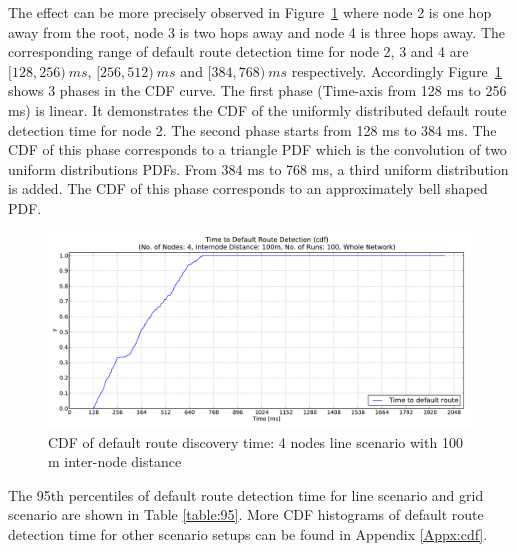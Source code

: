 The effect can be more precisely observed in Figure~\ref{fig:dist100_montecarlo_cdf_hist} where node 2 is one hop away from the root, node 3 is two hops away and node 4 is three hops away. The corresponding range of default route detection time for node 2, 3 and 4 are $[128, 256)\:ms$, $[256, 512)\:ms$ and $[384, 768)\:ms$ respectively. Accordingly Figure~\ref{fig:dist100_montecarlo_cdf_hist} shows 3 phases in the CDF curve. The first phase (Time-axis from 128 ms to 256 ms) is linear. It demonstrates the CDF of the uniformly distributed default route detection time for node 2. The second phase starts from 128 ms to 384 ms. The CDF of this phase corresponds to a triangle PDF which is the convolution of two uniform distributions PDFs. From 384 ms to 768 ms, a third uniform distribution is added. The CDF of this phase corresponds to an approximately bell shaped PDF.


\begin{figure}[htbp]
  \begin{center}
    \leavevmode
      \includegraphics[scale=0.38]
      {Pics/results/4/MRHOF/line/dist100_montecarlo_cdf_hist.pdf}
   \caption{CDF of default route discovery time: 4 nodes line scenario with 100 m inter-node distance}
    \label{fig:dist100_montecarlo_cdf_hist}
  \end{center}
   \vspace{-20pt}
\end{figure}


The 95th percentiles of default route detection time for line scenario and grid scenario are shown in Table \ref{table:95}. More CDF histograms of default route detection time for other scenario setups can be found in Appendix \ref{Appx:cdf}.

